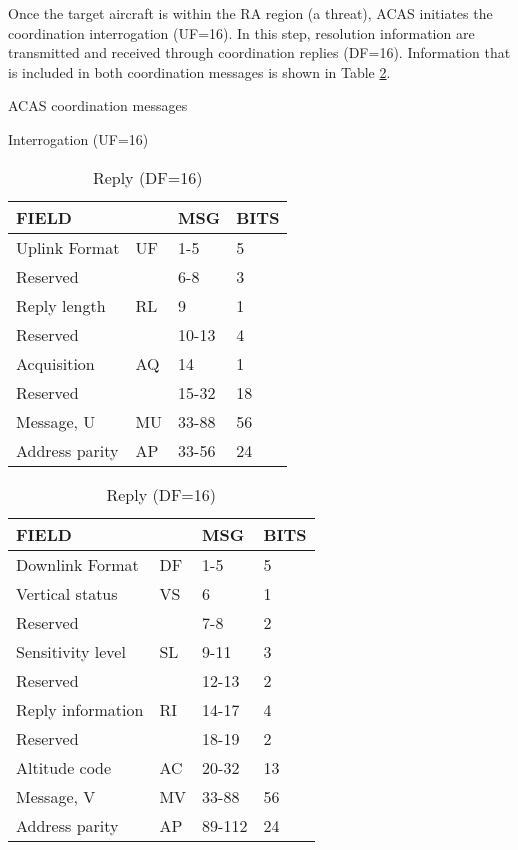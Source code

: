 Once the target aircraft is within the RA region (a threat), ACAS initiates the coordination interrogation (UF=16). In this step, resolution information are transmitted and received through coordination replies (DF=16). Information that is included in both coordination messages is shown in Table \ref{tb:acas_uf_df_16}.


\begin{table}[ht]

\caption{ACAS coordination messages}
\label{tb:acas_uf_df_16}
\begin{subtable}[t]{0.7\linewidth}
  \centering
  \caption{Interrogation (UF=16)}
  \begin{tabular}[t]{|l|l|l|l|}
  \hline
  \textbf{FIELD} & \textbf{} & \textbf{MSG} & \textbf{BITS} \\ \hline
  Uplink Format & UF & 1-5 & 5 \\ \hline
  Reserved &  & 6-8 & 3 \\ \hline
  Reply length & RL & 9 & 1 \\ \hline
  Reserved &  & 10-13 & 4 \\ \hline
  Acquisition & AQ & 14 & 1 \\ \hline
  Reserved &  & 15-32 & 18 \\ \hline
  Message, U & MU & 33-88 & 56 \\ \hline
  Address parity & AP & 33-56 & 24 \\ \hline
  \end{tabular}
\end{subtable}%

\vspace{0.5cm}

\begin{subtable}[t]{0.7\linewidth}
  \centering
  \caption{Reply (DF=16)}
  \begin{tabular}[t]{|l|l|l|l|}
  \hline
  \textbf{FIELD} & \textbf{} & \textbf{MSG} & \textbf{BITS} \\ \hline
  Downlink Format & DF & 1-5 & 5 \\ \hline
  Vertical status & VS & 6 & 1 \\ \hline
  Reserved &  & 7-8 & 2 \\ \hline
  Sensitivity level & SL & 9-11 & 3 \\ \hline
  Reserved &  & 12-13 & 2 \\ \hline
  Reply information & RI & 14-17 & 4 \\ \hline
  Reserved &  & 18-19 & 2 \\ \hline
  Altitude code & AC & 20-32 & 13 \\ \hline
  Message, V & MV & 33-88 & 56 \\ \hline
  Address parity & AP & 89-112 & 24 \\ \hline
  \end{tabular}
\end{subtable}
\end{table}


